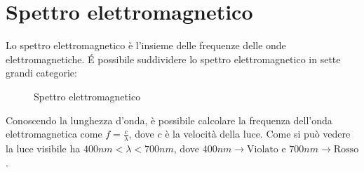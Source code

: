 
\section{Spettro elettromagnetico}

Lo spettro elettromagnetico è l'insieme delle frequenze delle onde elettromagnetiche.
É possibile suddividere lo spettro elettromagnetico in sette grandi categorie:

\begin{figure}[H]
    \centering
    \caption{Spettro elettromagnetico}
\end{figure}

Conoscendo la lunghezza d'onda, è possibile calcolare la frequenza dell'onda elettromagnetica come $f = \frac{c}{\lambda}$, dove $c$ è la velocità della luce.
Come si può vedere la luce visibile ha $400nm < \lambda < 700nm$, dove $400nm \rightarrow \text{Violato}$ e $700nm \rightarrow \text{Rosso}$.